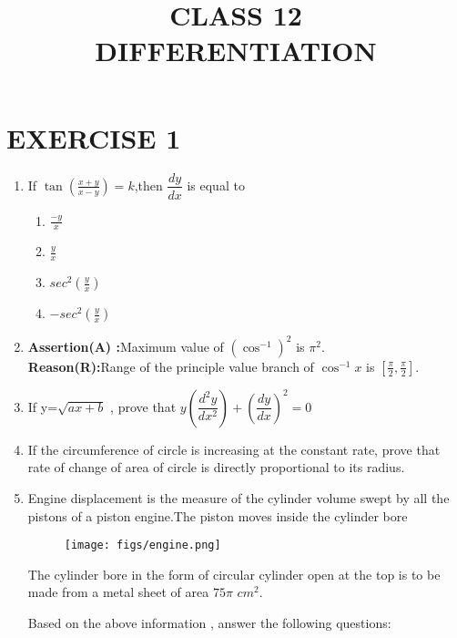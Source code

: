 \documentclass{article}
\providecommand{\sbrak}[1]{\ensuremath{{}\left[#1\right]}}
\providecommand{\brak}[1]{\ensuremath{\left(#1\right)}}
\begin{document}
\title{CLASS 12\\DIFFERENTIATION}
\date{}
\maketitle
\section{EXERCISE 1}
\begin{enumerate}
	\item If $\tan \brak{\frac{x+y}{x-y}}=k$,then $\dfrac{dy}{dx}$ is equal to 
		\begin{enumerate}
			\item $\frac{-y}{x}$
   \item $\frac{y}{x}$
			
			\item $sec^{2}\brak{\frac{y}{x}}$ 
   \item $-sec^{2}\brak{\frac{y}{x}}$ 
			
   \end{enumerate}
  \item  \textbf{Assertion(A) :}Maximum value of $\brak{{\cos^{-1}}}^2$ is ${{\pi}^2}$.\\
  \textbf{Reason(R):}Range of the principle value branch of ${{\cos^{-1}x}}$ is $\sbrak{{\frac{\pi}{2}},{\frac{\pi}{2}}}$.\\
	\item If y=$\sqrt{ax+b}$ , prove that $y\brak{\dfrac{d^2y}{dx^2}}+\brak{\dfrac{dy}{dx}}^2=0$ \\
 \item If the circumference of circle is increasing at the constant rate, prove that rate of change of area of circle is directly proportional to its radius.
 \newpage
 \item Engine displacement is the measure of the cylinder volume swept by all the pistons of a piston engine.The piston moves inside the cylinder bore  \\
  \begin{figure}[!ht]
\centering
\texttt{[image: figs/engine.png]}
\end{figure}
    

 The cylinder bore in the form of circular cylinder open at the top is to be made from a metal sheet of area ${75\pi}$ ${cm}^2.$ \newline

 Based on the above information , answer the following questions: \newline


\end{enumerate}
\end{document}
